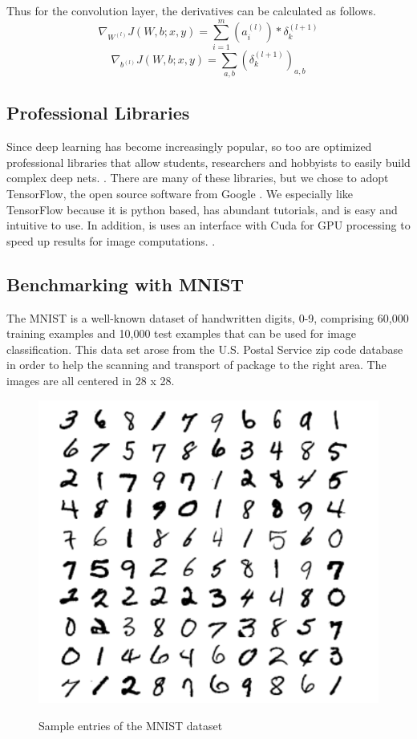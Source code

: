 \documentclass[12pt, twocolumn]{article}
\begin{document}
Thus for the convolution layer, the derivatives can be calculated as follows.
\begin{equation}
\nabla_{W^{(l)}}J(W,b;x,y) = \sum_{i=1}^m (a^{(l)}_i) \ast  \delta^{(l+1)}_k
\end{equation}
\begin{equation}
\nabla_{b^{(l)}}J(W,b;x,y)= \sum_{a,b}(\delta^{(l+1)}_k)_{a,b}
\end{equation}


\subsection{Professional Libraries}

Since deep learning has become increasingly popular, so too are optimized professional libraries  that allow students, researchers and hobbyists to easily build complex deep nets. . There are many of these libraries, but we chose to adopt TensorFlow, the open source software from Google \cite{TensorFlowGH}. We especially like TensorFlow because it is python based, has abundant tutorials, and is easy and intuitive to use. In addition, is uses an interface with Cuda for GPU processing to speed up results for image computations. \cite{TensorFlowWeb}. 



\subsection{Benchmarking with MNIST}


The MNIST is a well-known dataset of handwritten digits, 0-9, comprising 60,000 training examples and 10,000 test examples \cite{MNIST}  that can be used for image classification.  This data set arose from the U.S. Postal Service zip code database in order to help the scanning and transport of package to the right area. The images are all centered in 28 x 28.

\begin{figure}
\includegraphics[scale=.8]{MNISTnos.png}
\label{fig:MNISTex}
\caption{Sample entries of the MNIST dataset \cite{LeCun1998}}
\end{figure}
\end{document}
